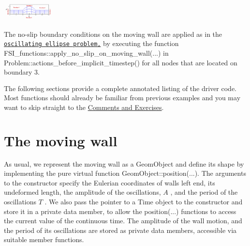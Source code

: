  
\begin{DoxyImage}
\includegraphics[width=0.20\textwidth]{mesh}
\end{DoxyImage}


The no-\/slip boundary conditions on the moving wall are applied as in the \href{../../osc_ellipse/html/index.html}{\tt oscillating ellipse problem,} by executing the function {\ttfamily F\+S\+I\+\_\+functions\+::apply\+\_\+no\+\_\+slip\+\_\+on\+\_\+moving\+\_\+wall}(...) in {\ttfamily Problem\+::actions\+\_\+before\+\_\+implicit\+\_\+timestep()} for all nodes that are located on boundary 3.

The following sections provide a complete annotated listing of the driver code. Most functions should already be familiar from previous examples and you may want to skip straight to the \hyperlink{index_comments}{Comments and Exercises}.



 

\hypertarget{index_wall}{}\section{The moving wall}\label{index_wall}
As usual, we represent the moving wall as a {\ttfamily Geom\+Object} and define its shape by implementing the pure virtual function {\ttfamily Geom\+Object\+::position}(...). The arguments to the constructor specify the Eulerian coordinates of wall\textquotesingle{}s left end, its undeformed length, the amplitude of the oscillations, $ A $ , and the period of the oscillations $ T $ . We also pass the pointer to a {\ttfamily Time} object to the constructor and store it in a private data member, to allow the {\ttfamily position}(...) functions to access the current value of the continuous time. The amplitude of the wall motion, and the period of its oscillations are stored as private data members, accessible via suitable member functions.

